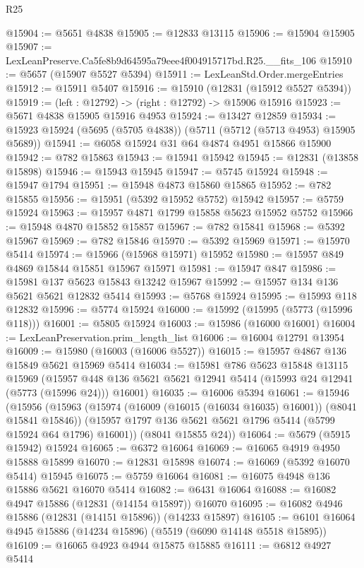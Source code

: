 \begin{lexlean}{R25}
\begin{coremodule}
@15904 := @5651 @4838
@15905 := @12833 @13115
@15906 := @15904 @15905
@15907 := LexLeanPreserve.Ca5fe8b9d64595a79eee4f004915717bd.R25.__fits_106
@15910 := @5657 (@15907 @5527 @5394)
@15911 := LexLeanStd.Order.mergeEntries
@15912 := @15911 @5407
@15916 := @15910 (@12831 (@15912 @5527 @5394))
@15919 := (left : @12792) -> (right : @12792) -> @15906 @15916
@15923 := @5671 @4838 @15905 @15916 @4953
@15924 := @13427 @12859
@15934 := @15923 @15924 (@5695 (@5705 @4838)) (@5711 (@5712 (@5713 @4953) @15905 @5689))
@15941 := @6058 @15924 @31 @64 @4874 @4951 @15866 @15900
@15942 := @782 @15863
@15943 := @15941 @15942
@15945 := @12831 (@13858 @15898)
@15946 := @15943 @15945
@15947 := @5745 @15924
@15948 := @15947 @1794
@15951 := @15948 @4873 @15860 @15865
@15952 := @782 @15855
@15956 := @15951 (@5392 @15952 @5752) @15942
@15957 := @5759 @15924
@15963 := @15957 @4871 @1799 @15858 @5623 @15952 @5752
@15966 := @15948 @4870 @15852 @15857
@15967 := @782 @15841
@15968 := @5392 @15967
@15969 := @782 @15846
@15970 := @5392 @15969
@15971 := @15970 @5414
@15974 := @15966 (@15968 @15971) @15952
@15980 := @15957 @849 @4869 @15844 @15851 @15967 @15971
@15981 := @15947 @847
@15986 := @15981 @137 @5623 @15843 @13242 @15967
@15992 := @15957 @134 @136 @5621 @5621 @12832 @5414
@15993 := @5768 @15924
@15995 := @15993 @118 @12832
@15996 := @5774 @15924
@16000 := @15992 (@15995 (@5773 (@15996 @118)))
@16001 := @5805 @15924
@16003 := @15986 (@16000 @16001)
@16004 := LexLeanPreservation.prim_length_list
@16006 := @16004 @12791 @13954
@16009 := @15980 (@16003 (@16006 @5527))
@16015 := @15957 @4867 @136 @15849 @5621 @15969 @5414
@16034 := @15981
    @786
    @5623
    @15848
    @13115
    @15969
    (@15957 @448 @136 @5621 @5621 @12941 @5414 (@15993 @24 @12941 (@5773 (@15996 @24))) @16001)
@16035 := @16006 @5394
@16061 := @15946
    (@15956
      (@15963
        (@15974 (@16009 (@16015 (@16034 @16035) @16001)) (@8041 @15841 @15846))
        (@15957 @1797 @136 @5621 @5621 @1796 @5414 (@5799 @15924 @64 @1796) @16001))
      (@8041 @15855 @24))
@16064 := @5679 (@5915 @15942) @15924
@16065 := @6372 @16064
@16069 := @16065 @4919 @4950 @15888 @15899
@16070 := @12831 @15898
@16074 := @16069 (@5392 @16070 @5414) @15945
@16075 := @5759 @16064
@16081 := @16075 @4948 @136 @15886 @5621 @16070 @5414
@16082 := @6431 @16064
@16088 := @16082 @4947 @15886 (@12831 (@14154 @15897)) @16070
@16095 := @16082 @4946 @15886 (@12831 (@14151 @15896)) (@14233 @15897)
@16105 := @6101 @16064 @4945 @15886 (@14234 @15896) (@5519 (@6090 @14148 @5518 @15895))
@16109 := @16065 @4923 @4944 @15875 @15885
@16111 := @6812 @4927 @5414

\end{coremodule}
\end{lexlean}
